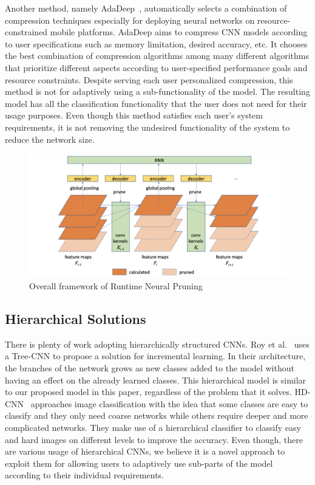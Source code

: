Another method, namely AdaDeep~\cite{Liu2018OnDemandDM}, automatically selects a combination of compression techniques especially for deploying neural networks on resource-constrained mobile platforms. 
AdaDeep aims to compress CNN models according to user specifications such as memory limitation, desired accuracy, etc. 
It chooses the best combination of compression algorithms among many different algorithms that prioritize different aspects according to user-specified performance goals and resource constraints. 
Despite serving each user personalized compression, this method is not for adaptively using a sub-functionality of the model.
The resulting model has all the classification functionality that the user does not need for their usage purposes. 
Even though this method satisfies each user's system requirements, it is not removing the undesired functionality of the system to reduce the network size.

\begin{figure}
    \centering
    \includegraphics[width=\textwidth]{thesis/images/runtimenp-fig.png}
    \caption{Overall framework of Runtime Neural Pruning\cite{Lin2017RuntimeNP}}
    \label{fig:runtimenp}
\end{figure}

\subsection*{Hierarchical Solutions}

There is plenty of work adopting hierarchically structured CNNs. Roy et al.~\cite{roy2018tree} uses a Tree-CNN to propose a solution for incremental learning. 
In their architecture, the branches of the network grows as new classes added to the model without having an effect on the already learned classes. 
This hierarchical model is similar to our proposed model in this paper, regardless of the problem that it solves. 
HD-CNN~\cite{Yan_2015_ICCV} approaches image classification with the idea that some classes are easy to classify and they only need coarse networks while others require deeper and more complicated networks. 
They make use of a hierarchical classifier to classify easy and hard images on different levels to improve the accuracy. 
Even though, there are various usage of hierarchical CNNs, we believe it is a novel approach to exploit them for allowing users to adaptively use sub-parts of the model according to their individual requirements.


